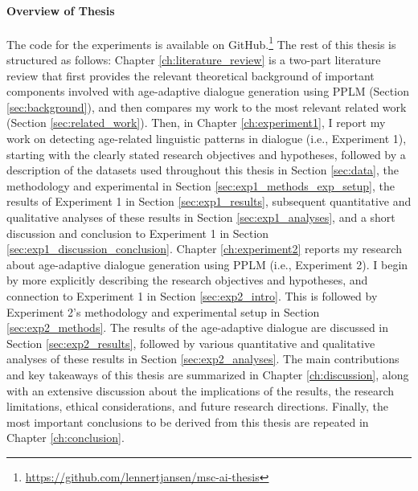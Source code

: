 
\paragraph{Overview of Thesis}
The code for the experiments is available on GitHub.\footnote{\url{https://github.com/lennertjansen/msc-ai-thesis}}
The rest of this thesis is structured as follows: Chapter \ref{ch:literature_review} is a two-part literature review that first provides the relevant theoretical background of important components involved with age-adaptive dialogue generation using PPLM (Section \ref{sec:background}), and then compares my work to the most relevant related work (Section \ref{sec:related_work}).
Then, in Chapter \ref{ch:experiment1}, I report my work on detecting age-related linguistic patterns in dialogue (i.e., Experiment 1), starting with the clearly stated research objectives and hypotheses, followed by a description of the datasets used throughout this thesis in Section \ref{sec:data}, the methodology and experimental in Section \ref{sec:exp1_methods_exp_setup}, the results of Experiment 1 in Section \ref{sec:exp1_results}, subsequent quantitative and qualitative analyses of these results in Section \ref{sec:exp1_analyses}, and a short discussion and conclusion to Experiment 1 in Section \ref{sec:exp1_discussion_conclusion}.
Chapter \ref{ch:experiment2} reports my research about age-adaptive dialogue generation using PPLM (i.e., Experiment 2). I begin by more explicitly describing the research objectives and hypotheses, and connection to Experiment 1 in Section \ref{sec:exp2_intro}. This is followed by Experiment 2's methodology and experimental setup in Section \ref{sec:exp2_methods}. The results of the age-adaptive dialogue are discussed in Section \ref{sec:exp2_results}, followed by various quantitative and qualitative analyses of these results in Section \ref{sec:exp2_analyses}.
The main contributions and key takeaways of this thesis are summarized in Chapter \ref{ch:discussion}, along with an extensive discussion about the implications of the results, the research limitations, ethical considerations, and future research directions.
Finally, the most important conclusions to be derived from this thesis are repeated in Chapter \ref{ch:conclusion}.


